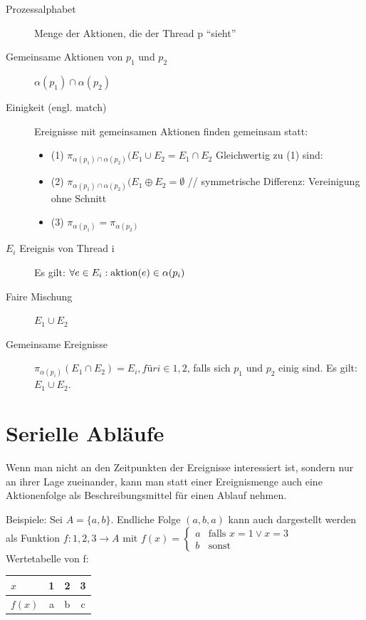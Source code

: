 \begin{description}
	\item[Prozessalphabet] Menge der Aktionen, die der Thread p "`sieht"'
	\item[Gemeinsame Aktionen von $ p_1 $ und $ p_2 $] $ \alpha(p_1) \cap \alpha(p_2) $
	\item[Einigkeit (engl. match)] Ereignisse mit gemeinsamen Aktionen finden gemeinsam statt:
	\begin{itemize} %
		\item (1) $ \pi_{\alpha(p_1) \cap \alpha(p_2)}(E_1 \cup E_2 = E_1 \cap E_2 $ Gleichwertig zu (1) sind:\\
		\item (2) $ \pi_{\alpha(p_1) \cap \alpha(p_2)}(E_1 \oplus E_2 = \emptyset $ // symmetrische Differenz: Vereinigung ohne Schnitt
		\item (3) $ \pi_{\alpha(p_1)} = \pi_{\alpha(p_2)} $
	\end{itemize}
	\item[$ E_i $ Ereignis von Thread i] Es gilt: $ \forall e \in E_i: \operatorname{aktion}(e) \in \alpha(p_i) $
	\item[Faire Mischung] $ E_1 \cup E_2 $
	\item[Gemeinsame Ereignisse] $ \pi_{\alpha(p_i)}(E_1 \cap E_2) = E_i, für i \in {1, 2} $, falls sich $ p_1 $ und $ p_2 $ einig sind. Es gilt: $ E_1 \cup E_2 $.
\end{description}


\section{Serielle Abläufe}
Wenn man nicht an den Zeitpunkten der Ereignisse interessiert ist, sondern nur an ihrer Lage zueinander, kann man statt einer Ereignismenge auch eine Aktionenfolge als Beschreibungsmittel für einen Ablauf nehmen.

Beispiele: Sei $ A = \{a, b\} $. Endliche Folge $ (a, b, a) $ kann auch dargestellt werden als Funktion $ f: {1, 2, 3} \rightarrow A $ mit $ f(x) = \begin{cases} a & \text{falls } x = 1 \vee x = 3\\ b & \text{sonst}\end{cases} $\\
Wertetabelle von f:
\begin{center}
	\begin{tabular}{l|c c c}
		$ x $ & 1 & 2 & 3\\ \hline
		$ f(x) $ & a & b & c
	\end{tabular}
\end{center}

